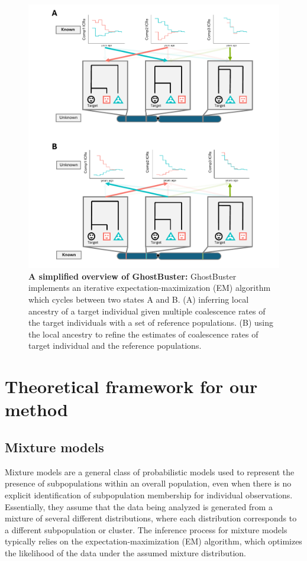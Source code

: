 \begin{figure}[h!]
    \centering
    \includegraphics[width=\textwidth]{figures/thesis_gb_simplified_overview.pdf}
    \caption{\textbf{A simplified overview of GhostBuster:} GhostBuster implements an iterative expectation-maximization (EM) algorithm which cycles between two states A and B. (A) inferring local ancestry of a target individual given multiple coalescence rates of the target individuals with a set of reference populations. (B) using the local ancestry to refine the estimates of coalescence rates of target individual and the reference populations.}
    \label{fig:gb-simplified-overview}
\end{figure}

\section{Theoretical framework for our method}
\label{sec:ch2-gb-theory}

\subsection{Mixture models}

Mixture models are a general class of probabilistic models used to represent the presence of subpopulations within an overall population, even when there is no explicit identification of subpopulation membership for individual observations. Essentially, they assume that the data being analyzed is generated from a mixture of several different distributions, where each distribution corresponds to a different subpopulation or cluster. The inference process for mixture models typically relies on the expectation-maximization (EM) algorithm, which optimizes the likelihood of the data under the assumed mixture distribution.

